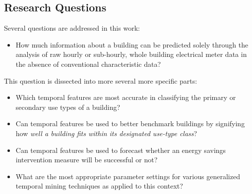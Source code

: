 \subsection{Research Questions}
Several questions are addressed in this work:
\begin{itemize}
\item How much information about a building can be predicted solely through the analysis of raw hourly or sub-hourly, whole building electrical meter data in the absence of conventional characteristic data? 
\end{itemize}
This question is dissected into more several more specific parts:
\begin{itemize}
\item Which temporal features are most accurate in classifying the primary or secondary use types of a building?
\item Can temporal features be used to better benchmark buildings by signifying how \emph{well a building fits within its designated use-type class}?
\item Can temporal features be used to forecast whether an energy savings intervention measure will be successful or not?
\item What are the most appropriate parameter settings for various generalized temporal mining techniques as applied to this context?
\end{itemize}






